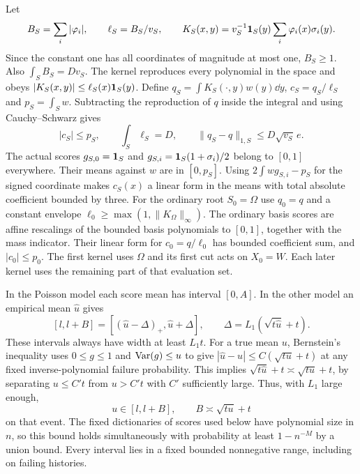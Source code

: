 Let
\[
 B_S=\sum_i|\varphi_i|,\qquad
 \ell_S=B_S/v_S,\qquad
 K_S(x,y)=v_S^{-1}\mathbf 1_S(y)\sum_i\varphi_i(x)\sigma_i(y).
\]
Since the constant one has all coordinates of magnitude at most
one, \(B_S\ge1\). Also \(\int_S B_S=Dv_S\).
The kernel reproduces every polynomial in the space and obeys
\(|K_S(x,y)|\le\ell_S(x)\mathbf 1_S(y)\). Define
\(q_S=\int K_S(\cdot,y)w(y)\dd y\), \(c_S=q_S/\ell_S\)
and \(p_S=\int_S w\). Subtracting the reproduction of \(q\)
inside the integral and using Cauchy--Schwarz gives
\begin{equation}\label{eq:regional}
 |c_S|\le p_S,\qquad \int_S\ell_S=D,\qquad
 \|q_S-q\|_{1,S}\le D\sqrt{v_S}\,e .
\end{equation}
The actual scores \(g_{S,0}=\mathbf 1_S\) and
\(g_{S,i}=\mathbf 1_S(1+\sigma_i)/2\) belong to \([0,1]\)
everywhere. Their means against \(w\) are in \([0,p_S]\).
Using \(2\int w g_{S,i}-p_S\) for the signed coordinate
makes \(c_S(x)\) a linear form in the means with total absolute
coefficient bounded by three. For the ordinary root
\(S_0=\Omega\) use \(q_0=q\) and a constant envelope
\(\ell_0\ge\max(1,\|K_\Omega\|_\infty)\). The ordinary basis
scores are affine rescalings of the bounded basis polynomials
to \([0,1]\), together with the mass indicator. Their linear
form for \(c_0=q/\ell_0\) has bounded coefficient sum, and
\(|c_0|\le p_0\). The first kernel uses \(\Omega\) and its
first cut acts on \(X_0=W\). Each later kernel uses the
remaining part of that evaluation set.

In the Poisson model each score mean has interval \([0,A]\).
In the other model an empirical mean \(\widehat u\) gives
\[
 [l,l+B]=[(\widehat u-\Delta)_+,\widehat u+\Delta],
 \qquad \Delta=L_1(\sqrt{t\widehat u}+t).
\]
These intervals always have width at least \(L_1t\).
For a true mean \(u\), Bernstein's inequality uses
\(0\le g\le1\) and \(\operatorname{Var}(g)\le u\) to give
\(|\widehat u-u|\le C(\sqrt{tu}+t)\) at any fixed
inverse-polynomial failure probability. This implies
\(\sqrt{t\widehat u}+t\asymp\sqrt{tu}+t\), by separating
\(u\le C't\) from \(u>C't\) with \(C'\) sufficiently large.
Thus, with \(L_1\) large enough,
\begin{equation}\label{eq:interval}
 u\in[l,l+B],\qquad B\asymp\sqrt{tu}+t
\end{equation}
on that event. The fixed dictionaries of scores used below
have polynomial size in \(n\), so this bound holds simultaneously
with probability at least \(1-n^{-M}\) by a union bound.
Every interval lies in a fixed bounded nonnegative range,
including on failing histories.

